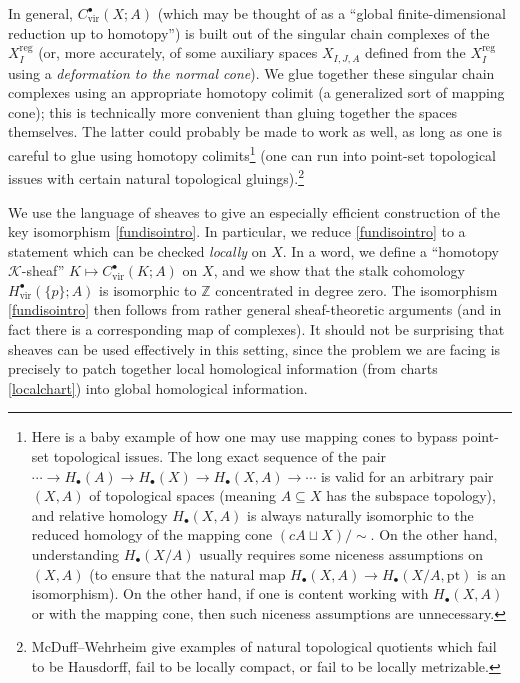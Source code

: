 \documentclass[12pt]{article}
\theoremstyle{definition}
\theoremstyle{remark}
\numberwithin{equation}{subsection}
\newcommand{\K}{\mathcal K}
\newcommand{\ZZ}{\mathbb Z}
\newcommand{\vir}{\mathrm{vir}}
\newcommand{\pt}{\mathrm{pt}}
\newcommand{\reg}{\mathrm{reg}}
\begin{document}
In general, $C^\bullet_\vir(X;A)$ (which may be thought of as a ``global finite-dimensional reduction up to homotopy'') is built out of the singular chain complexes of the $X_I^\reg$ (or, more accurately, of some auxiliary spaces $X_{I,J,A}$ defined from the $X_I^\reg$ using a \emph{deformation to the normal cone}).  We glue together these singular chain complexes using an appropriate homotopy colimit (a generalized sort of mapping cone); this is technically more convenient than gluing together the spaces themselves.  The latter could probably be made to work as well, as long as one is careful to glue using homotopy colimits\footnote{Here is a baby example of how one may use mapping cones to bypass point-set topological issues.  The long exact sequence of the pair $\cdots\to H_\bullet(A)\to H_\bullet(X)\to H_\bullet(X,A)\to\cdots$ is valid for an arbitrary pair $(X,A)$ of topological spaces (meaning $A\subseteq X$ has the subspace topology), and relative homology $H_\bullet(X,A)$ is always naturally isomorphic to the reduced homology of the mapping cone $(cA\sqcup X)/\sim$.  On the other hand, understanding $H_\bullet(X/A)$ usually requires some niceness assumptions on $(X,A)$ (to ensure that the natural map $H_\bullet(X,A)\to H_\bullet(X/A,\pt)$ is an isomorphism).  On the other hand, if one is content working with $H_\bullet(X,A)$ or with the mapping cone, then such niceness assumptions are unnecessary.} (one can run into point-set topological issues with certain natural topological gluings).\footnote{McDuff--Wehrheim \cite[Examples 3.1.14 and 3.1.15]{mcduffwehrheim} give examples of natural topological quotients which fail to be Hausdorff, fail to be locally compact, or fail to be locally metrizable.}

We use the language of sheaves to give an especially efficient construction of the key isomorphism \eqref{fundisointro}.  In particular, we reduce \eqref{fundisointro} to a statement which can be checked \emph{locally} on $X$.  In a word, we define a ``homotopy $\K$-sheaf'' $K\mapsto C^\bullet_\vir(K;A)$ on $X$, and we show that the stalk cohomology $H^\bullet_\vir(\{p\};A)$ is isomorphic to $\ZZ$ concentrated in degree zero.  The isomorphism \eqref{fundisointro} then follows from rather general sheaf-theoretic arguments (and in fact there is a corresponding map of complexes).  It should not be surprising that sheaves can be used effectively in this setting, since the problem we are facing is precisely to patch together local homological information (from charts \eqref{localchart}) into global homological information.
\end{document}
